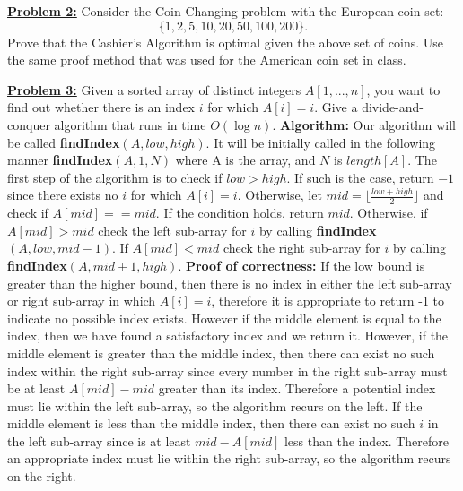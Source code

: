 \documentclass[11pt]{article}
\begin{document}
\begin{flushleft}
	\newpage
	\item \textbf {\underline{Problem 2:}} Consider the Coin Changing problem with the European coin set:
	\begin{displaymath}
	\{ 1, 2, 5, 10, 20, 50, 100, 200 \}.
	\end{displaymath}
	Prove that the Cashier's Algorithm is optimal given the above set of coins.
	Use the same proof method that was used for the American coin set in class.
	\newpage
	\item \textbf {\underline{Problem 3:}} Given a sorted array of distinct integers $A[1, . . . , n]$, you want to
	find out whether there is an index $i$ for which $A[i] = i$. Give a
	divide-and-conquer algorithm that runs in time $O(\log n).$
	\newline
	\newline
	\textbf{Algorithm:} Our algorithm will be called \textbf{findIndex}$(A, low, high)$. It will be initially called in the following manner \textbf{findIndex}$(A, 1, N)$ where A is the array, and $N$ is $length[A]$. The first step of the algorithm is to check if $low > high$. If such is the case, return $-1$ since there exists no $i$ for which $A[i] = i$. Otherwise, let $mid = \lfloor \frac{low + high}{2} \rfloor$ and check if $A[mid] == mid$. If the condition holds, return $mid$. Otherwise, if $A[mid] > mid$ check the left sub-array for $i$ by calling \textbf{findIndex}$(A, low, mid - 1)$. If $A[mid] < mid$ check the right sub-array for $i$ by calling \textbf{findIndex}$(A, mid + 1, high)$. 
	\newline
	\newline
	\textbf{Proof of correctness:} If the low bound is greater than the higher bound, then there is no index in either the left sub-array or right sub-array in which $A[i] = i$, therefore it is appropriate to return -1 to indicate no possible index exists. However if the middle element is equal to the index, then we have found a satisfactory index and we return it. However, if the middle element is greater than the middle index, then there can exist no such index within the right sub-array since every number in the right sub-array must be at least $A[mid] - mid$ greater than its index. Therefore a potential index must lie within the left sub-array, so the algorithm recurs on the left. If the middle element is less than the middle index, then there can exist no such $i$ in the left sub-array since is at least $mid - A[mid]$ less than the index. Therefore an appropriate index must lie within the right sub-array, so the algorithm recurs on the right. 

\end{flushleft}
\end{document}
